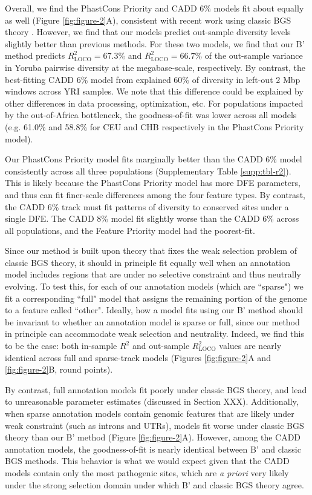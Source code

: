 \documentclass[11pt]{article}
\begin{document}
Overall, we find the PhastCons Priority and CADD 6\% models fit about equally
as well (Figure \ref{fig:figure-2}A), consistent with recent work using classic
BGS theory \parencite{Murphy2022-sj}. However, we find that our models predict
out-sample diversity levels slightly better than previous methods. For these
two models, we find that our B' method predicts $R_\text{LOCO}^2=67.3$\% and
$R_\text{LOCO}^2=66.7$\% of the out-sample variance in Yoruba pairwise
diversity at the megabase-scale, respectively. By contrast, the best-fitting
CADD 6\% model from \textcite{Murphy2022-sj} explained 60\% of diversity in
left-out 2 Mbp windows across YRI samples. We note that this difference could
be explained by other differences in data processing, optimization, etc. For
populations impacted by the out-of-Africa bottleneck, the goodness-of-fit was
lower across all models (e.g. 61.0\% and 58.8\% for CEU and CHB respectively in
the PhastCons Priority model).

Our PhastCons Priority model fits marginally better than the CADD 6\% model
consistently across all three populations (Supplementary Table
\ref{supp:tbl-r2}). This is likely because the PhastCons Priority model has
more DFE parameters, and thus can fit finer-scale differences among the four
feature types. By contrast, the CADD 6\% track must fit patterns of diversity
to conserved sites under a single DFE. The CADD 8\% model fit slightly worse
than the CADD 6\% across all populations, and the Feature Priority model had
the poorest-fit.

Since our method is built upon theory that fixes the weak selection problem of
classic BGS theory, it should in principle fit equally well when an annotation
model includes regions that are under no selective constraint and thus
neutrally evolving. To test this, for each of our annotation models (which are
``sparse") we fit a corresponding ``full" model that assigns the remaining
portion of the genome to a feature called ``other". Ideally, how a model fits
using our B' method should be invariant to whether an annotation model is
sparse or full, since our method in principle can accommodate weak selection
and neutrality. Indeed, we find this to be the case: both in-sample $R^2$ and
out-sample $R_\text{LOCO}^2$ values are nearly identical across full and
sparse-track models (Figures \ref{fig:figure-2}A and \ref{fig:figure-2}B, round
points). 

By contrast, full annotation models fit poorly under classic BGS theory, and
lead to unreasonable parameter estimates (discussed in Section XXX).
Additionally, when sparse annotation models contain genomic features that are
likely under weak constraint (such as introns and UTRs), models fit worse under
classic BGS theory than our B' method (Figure \ref{fig:figure-2}A). However,
among the CADD annotation models, the goodness-of-fit is nearly identical
between B' and classic BGS methods. This behavior is what we would expect given
that the CADD models contain only the most pathogenic sites, which are \emph{a
priori} very likely under the strong selection domain under which B' and
classic BGS theory agree.
\end{document}
